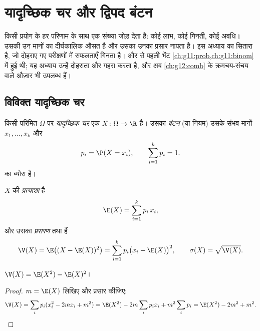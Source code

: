 \chapter{यादृच्छिक चर और द्विपद बंटन}\label{ch:g12:randvar}

 किसी प्रयोग के हर परिणाम के साथ एक संख्या जोड़ देता है: कोई लाभ,
कोई गिनती, कोई अवधि। उसकी  उन मानों का दीर्घकालिक औसत है और उसका
 उनका प्रसार नापता है। इस अध्याय का सितारा  है, जो दोहराए गए
 परीक्षणों में सफलताएँ गिनता है।  और  से पहली
भेंट \cref{ch:g11:prob,ch:g11:binom} में हुई थी; यह अध्याय उन्हें दोहराता और गहरा करता है, और अब \cref{ch:g12:comb} के
क्रमचय-संचय वाले औज़ार भी उपलब्ध हैं।

\section{विविक्त यादृच्छिक चर}

\begin{definition}[यादृच्छिक चर, बंटन]\label{def:g12:randvar:rv}
किसी परिमित  $\Omega$ पर \emph{यादृच्छिक चर}
एक  $X \colon \Omega \to \R$ है। उसका \emph{बंटन} (या नियम) उसके संभव मानों $x_1, \dots, x_k$ और
\[
p_i = \P(X = x_i), \qquad \sum_{i=1}^{k} p_i = 1 .
\]
का ब्योरा है।
\end{definition}

\begin{definition}\label{def:g12:randvar:exp}
$X$ की \emph{प्रत्याशा} है
\[
\E(X) = \sum_{i=1}^{k} p_i\, x_i ,
\]
और उसका \emph{प्रसरण} तथा \emph{} हैं
\[
\V(X) = \E\bigl((X - \E(X))^2\bigr) = \sum_{i=1}^k p_i\bigl(x_i - \E(X)\bigr)^2,
\qquad
\sigma(X) = \sqrt{\V(X)} .
\]
\end{definition}

\begin{proposition}[कोनिग--होयगेंस सूत्र]\label{prop:g12:randvar:konig}
$\V(X) = \E(X^2) - \E(X)^2$।
\end{proposition}

\begin{proof}
$m = \E(X)$ लिखिए और प्रसार कीजिए:
\[
\V(X) = \sum_i p_i (x_i^2 - 2m x_i + m^2)
= \E(X^2) - 2m\sum_i p_i x_i + m^2\sum_i p_i
= \E(X^2) - 2m^2 + m^2 . \qedhere
\]
\end{proof}

